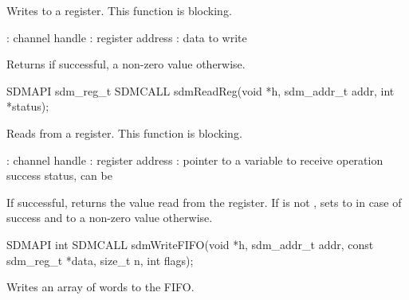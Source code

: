 \documentclass[a4paper,12pt,twoside,extrafontsizes]{memoir}
\begin{document}
\begin{funcdescr}
	Writes to a register. This function is blocking.
\end{funcdescr}

\begin{funcparams}
	: channel handle
	: register address
	: data to write
\end{funcparams}

\begin{funcret}
	Returns  if successful, a non-zero value otherwise.
\end{funcret}



\begin{cfuncprototype}
SDMAPI sdm_reg_t SDMCALL sdmReadReg(void *h, sdm_addr_t addr, int *status);
\end{cfuncprototype}

\begin{funcdescr}
	Reads from a register. This function is blocking.
\end{funcdescr}

\begin{funcparams}
	: channel handle
	: register address
	: pointer to a variable to receive operation success status, can be 
\end{funcparams}

\begin{funcret}
	If successful, returns the value read from the register. If  is not , sets  to  in case of success and to a non-zero value otherwise.
\end{funcret}



\begin{cfuncprototype}
SDMAPI int SDMCALL sdmWriteFIFO(void *h, sdm_addr_t addr, const sdm_reg_t *data, size_t n, int flags);
\end{cfuncprototype}

\begin{funcdescr}
	Writes an array of words to the FIFO.
\end{funcdescr}
\end{document}
